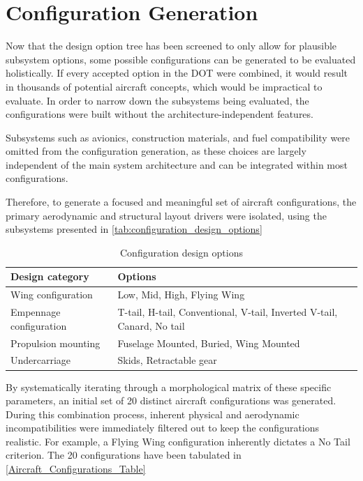 \chapter{Configuration Generation}

Now that the design option tree has been screened to only allow for plausible subsystem options, some possible configurations can be generated to be evaluated holistically. If every accepted option in the DOT were combined, it would result in thousands of potential aircraft concepts, which would be impractical to evaluate. In order to narrow down the subsystems being evaluated, the configurations were built without the architecture-independent features.

Subsystems such as avionics, construction materials, and fuel compatibility were omitted from the configuration generation, as these choices are largely independent of the main system architecture and can be integrated within most configurations.

Therefore, to generate a focused and meaningful set of aircraft configurations, the primary aerodynamic and structural layout drivers were isolated, using the subsystems presented in \autoref{tab:configuration_design_options} 


\begin{table}[H]
    \centering
    \caption{Configuration design options}
    \label{tab:configuration_design_options}
    \begin{tabular}{|l|l|}
        \hline
        \textbf{Design category} & \textbf{Options} \\ \hline \hline
        Wing configuration & Low, Mid, High, Flying Wing \\ \hline
        Empennage configuration & T-tail, H-tail, Conventional, V-tail, Inverted V-tail, Canard, No tail \\ \hline
        Propulsion mounting & Fuselage Mounted, Buried, Wing Mounted \\ \hline
        Undercarriage & Skids, Retractable gear \\ \hline
    \end{tabular}
\end{table}
By systematically iterating through a morphological matrix of these specific parameters, an initial set of 20 distinct aircraft configurations was generated. During this combination process, inherent physical and aerodynamic incompatibilities were immediately filtered out to keep the configurations realistic. For example, a Flying Wing configuration inherently dictates a No Tail criterion. The 20 configurations have been tabulated in \autoref{Aircraft_Configurations_Table}

